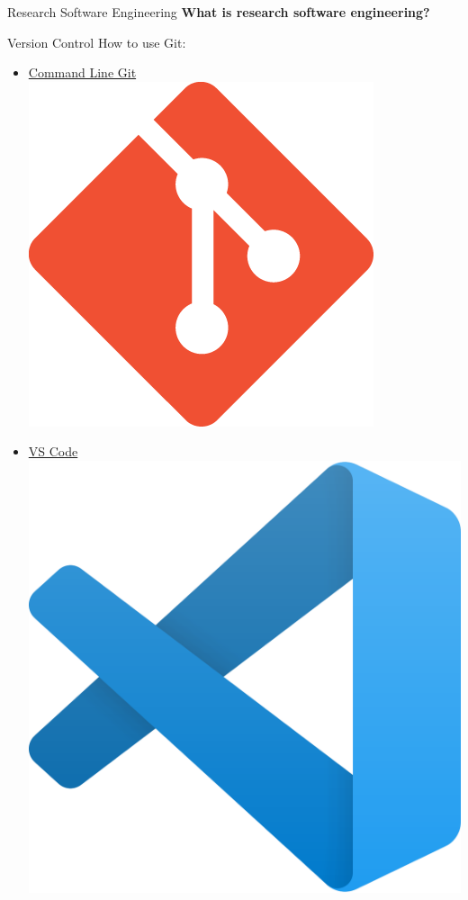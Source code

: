 \documentclass{beamer} %
\begin{document}
  \begin{frame}{Research Software Engineering}
    \textbf{What is research software engineering?}
  \end{frame}




  \begin{frame}{Version Control}
    How to use Git:
    \begin{itemize}
      \item \href{https://git-scm.com/}{Command Line Git \includegraphics[height=.05\textheight]{git}}
      \item \href{https://code.visualstudio.com/}{VS Code \includegraphics[height=.05\textheight]{vscode}}

\end{itemize}
\end{frame}
\end{document}

